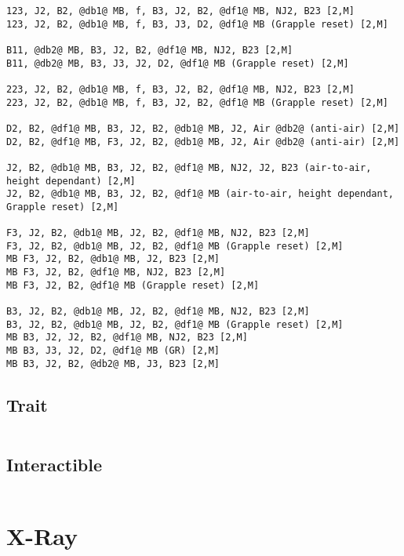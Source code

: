 \documentclass[main.tex]{subfiles}
\begin{document}
\begin{lstlisting}[language=FG]
123, J2, B2, @db1@ MB, f, B3, J2, B2, @df1@ MB, NJ2, B23 [2,M]
123, J2, B2, @db1@ MB, f, B3, J3, D2, @df1@ MB (Grapple reset) [2,M]

B11, @db2@ MB, B3, J2, B2, @df1@ MB, NJ2, B23 [2,M]
B11, @db2@ MB, B3, J3, J2, D2, @df1@ MB (Grapple reset) [2,M]

223, J2, B2, @db1@ MB, f, B3, J2, B2, @df1@ MB, NJ2, B23 [2,M]
223, J2, B2, @db1@ MB, f, B3, J2, B2, @df1@ MB (Grapple reset) [2,M]

D2, B2, @df1@ MB, B3, J2, B2, @db1@ MB, J2, Air @db2@ (anti-air) [2,M]
D2, B2, @df1@ MB, F3, J2, B2, @db1@ MB, J2, Air @db2@ (anti-air) [2,M]

J2, B2, @db1@ MB, B3, J2, B2, @df1@ MB, NJ2, J2, B23 (air-to-air, height dependant) [2,M]
J2, B2, @db1@ MB, B3, J2, B2, @df1@ MB (air-to-air, height dependant, Grapple reset) [2,M]

F3, J2, B2, @db1@ MB, J2, B2, @df1@ MB, NJ2, B23 [2,M]
F3, J2, B2, @db1@ MB, J2, B2, @df1@ MB (Grapple reset) [2,M]
MB F3, J2, B2, @db1@ MB, J2, B23 [2,M]
MB F3, J2, B2, @df1@ MB, NJ2, B23 [2,M]
MB F3, J2, B2, @df1@ MB (Grapple reset) [2,M]

B3, J2, B2, @db1@ MB, J2, B2, @df1@ MB, NJ2, B23 [2,M]
B3, J2, B2, @db1@ MB, J2, B2, @df1@ MB (Grapple reset) [2,M]
MB B3, J2, J2, B2, @df1@ MB, NJ2, B23 [2,M]
MB B3, J3, J2, D2, @df1@ MB (GR) [2,M]
MB B3, J2, B2, @db2@ MB, J3, B23 [2,M]
\end{lstlisting}

\subsection{Trait}
\begin{lstlisting}[language=FG]
\end{lstlisting}


\subsection{Interactible}
\begin{lstlisting}[language=FG]

\end{lstlisting}

\section{X-Ray}
\begin{lstlisting}[language=FG]

\end{lstlisting}
\end{document}
